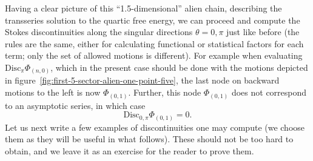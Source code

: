 \documentclass[11pt,a4paper]{article}
\newcommand{\be}{\begin{equation}}
\newcommand{\ee}{\end{equation}}
\def\disc{{\mathrm{Disc}}}
\begin{document}
Having a clear picture of this ``1.5-dimensional'' alien chain, describing the transseries solution to the quartic free energy, we can proceed and compute the Stokes discontinuities along the singular directions $\theta=0,\pi$ just like before (the rules are the same, either for calculating functional or statistical factors for each term; only the set of allowed motions is different). For example when evaluating $\disc_{\pi} \Phi_{(n,0)}$, which in the present case should be done with the motions depicted in figure~\ref{fig:first-5-sector-alien-one-point-five}, the last node on backward motions to the left is now $\Phi_{(0,1)}$. Further, this node $\Phi_{(0,1)}$ does not correspond to an asymptotic series, in which case
%
\be
\label{stokes-zeropi-0|1-quartic}
\disc_{0,\pi}\Phi_{(0,1)}=0.
\ee
%
\noindent
Let us next write a few examples of discontinuities one may compute (we choose them as they will be useful in what follows). These should not be too hard to obtain, and we leave it as an exercise for the reader to prove them.
%
\end{document}
